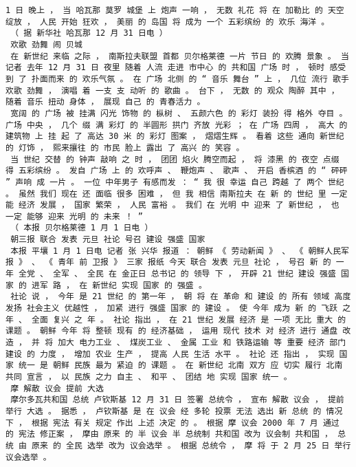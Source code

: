 \documentclass{article}
\begin{document}
\begin{Verbatim}[commandchars=\\\{\}]
 1 日 晚上 ， 当 哈瓦那 莫罗 城堡 上 炮声 一响 ， 无数 礼花 将 在 加勒比 的 天空 绽放 ， 人民 开始 狂欢 ， 美丽 的 岛国 将 成为 一个 五彩缤纷 的 欢乐 海洋 。 
 （ 据 新华社 哈瓦那 12 月 31 日电 ） 
 欢歌 劲舞 闹 贝城 
 在 新世纪 来临 之际 ， 南斯拉夫联盟 首都 贝尔格莱德 一片 节日 的 欢腾 景象 。 当 记者 去年 12 月 31 日 夜里 随着 人流 走进 市中心 的 共和国 广场 时 ， 顿时 感受 到 了 扑面而来 的 欢乐气氛 。 在 广场 北侧 的 “ 音乐 舞台 ” 上 ， 几位 流行 歌手 欢歌 劲舞 ， 演唱 着 一支 支 动听 的 歌曲 。 台下 ， 无数 的 观众 陶醉 其中 ， 随着 音乐 扭动 身体 ， 展现 自己 的 青春活力 。 
 宽阔 的 广场 被 挂满 闪光 饰物 的 枞树 、 五颜六色 的 彩灯 装扮 得 格外 夺目 。 广场 中央 ， 几个 缀 满 彩灯 的 半圆形 拱门 齐放 光彩 ； 在 广场 四周 ， 高大 的 建筑物 上 挂 起 了 高达 30 米 的 彩灯 图案 ， 熠熠生辉 。 看着 这些 通向 新世纪 的 灯饰 ， 熙来攘往 的 市民 脸上 露出 了 高兴 的 笑容 。 
 当 世纪 交替 的 钟声 敲响 之 时 ， 团团 焰火 腾空而起 ， 将 漆黑 的 夜空 点缀 得 五彩缤纷 。 发自 广场 上 的 欢呼声 、 鞭炮声 、 歌声 、 开启 香槟酒 的 “ 砰砰 ” 声响 成 一片 。 一位 中年男子 有感而发 ： “ 我 很 幸运 自己 跨越 了 两个 世纪 。 虽然 我们 现在 还 面临 很多 困难 ， 但 我 相信 南斯拉夫 在 新 的 世纪 里 一定 能 经济 发展 ， 国家 繁荣 ， 人民 富裕 。 我们 在 光明 中 迎来 了 新世纪 ， 也 一定 能够 迎来 光明 的 未来 ！ ” 
 （ 本报 贝尔格莱德 1 月 1 日电 ） 
 朝三报 联合 发表 元旦 社论 号召 建设 强盛 国家 
 本报 平壤 1 月 1 日电 记者 张 兴华 报道 ： 朝鲜 《 劳动新闻 》 、 《 朝鲜人民军 报 》 、 《 青年 前 卫报 》 三家 报纸 今天 联合 发表 元旦 社论 ， 号召 新 的 一年 全党 、 全军 、 全民 在 金正日 总书记 的 领导 下 ， 开辟 21 世纪 建设 强盛 国家 的 进军 路 ， 在 新世纪 实现 国家 的 强盛 。 
 社论 说 ， 今年 是 21 世纪 的 第一年 ， 朝 将 在 革命 和 建设 的 所有 领域 高度 发扬 社会主义 优越性 ， 加紧 进行 强盛 国家 的 建设 。 使 今年 成为 新 的 飞跃 之 年 、 全面 复兴 之 年 。 社论 指出 ， 在 21 世纪 发展 经济 是 一项 无比 重大 的 课题 。 朝鲜 今年 将 整顿 现有 的 经济基础 ， 运用 现代 技术 对 经济 进行 通盘 改造 ， 并 将 加大 电力工业 、 煤炭工业 、 金属 工业 和 铁路运输 等 重要 经济 部门 建设 的 力度 ， 增加 农业 生产 ， 提高 人民 生活 水平 。 社论 还 指出 ， 实现 国家 统一 是 朝鲜 民族 最为 紧迫 的 课题 。 在 新世纪 北南 双方 应 切实 履行 北南 共同 宣言 ， 以 民族 之力 自主 、 和平 、 团结 地 实现 国家 统一 。 
 摩 解散 议会 提前 大选 
 摩尔多瓦共和国 总统 卢钦斯基 12 月 31 日 签署 总统令 ， 宣布 解散 议会 ， 提前 举行 大选 。 据悉 ， 卢钦斯基 是 在 议会 经 多轮 投票 无法 选出 新 总统 的 情况 下 ， 根据 宪法 有关 规定 作出 上述 决定 的 。 根据 摩 议会 2000 年 7 月 通过 的 宪法 修正案 ， 摩由 原来 的 半 议会 半 总统制 共和国 改为 议会制 共和国 ， 总统 由 原来 的 全民 选举 改为 议会选举 。 根据 总统令 ， 摩 将 于 2 月 25 日 举行 议会选举 。 

\end{Verbatim}
\end{document}

